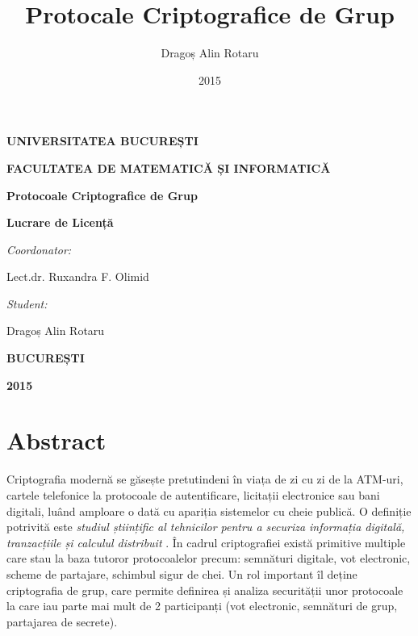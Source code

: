 \documentclass[oneside, 12pt]{book}
\title{Protocale Criptografice de Grup}
\author{Dragoș Alin Rotaru}
\date{2015}
\begin{document}
\thispagestyle{empty}

\nocite*{}

\begin{center}
\centerline{\bf UNIVERSITATEA BUCUREȘTI}
\centerline{\bf FACULTATEA DE MATEMATICĂ ȘI INFORMATICĂ}

\end{center}
\vspace{4.5cm}

\centerline{\huge \bf Protocoale Criptografice de Grup}

\vspace{0.5cm}

\centerline{\large \bf Lucrare de Licență}

\vspace{3.5cm}

\begin{flushleft}
{\Large \textit{Coordonator:}\vspace{0.2cm}}

{\Large Lect.dr. Ruxandra F. Olimid}
\end{flushleft}

\vspace{1cm}
\begin{flushright}
{\Large \textit{Student:}\vspace{0.2cm}}

{\Large Dragoș Alin Rotaru}
\end{flushright}


\vspace{2cm}

\centerline{\bf BUCUREȘTI}

\centerline{\bf 2015}

\chapter*{Abstract}

\hspace*{5mm} Criptografia modernă se găsește pretutindeni în viața de zi cu zi de la ATM-uri, cartele telefonice la protocoale de autentificare, licitații electronice sau bani digitali, luând amploare o dată cu apariția sistemelor cu cheie publică. O definiție potrivită este \textit{studiul științific al tehnicilor pentru a securiza informația digitală, tranzacțiile și calculul distribuit} \cite{Katz:2007}. În cadrul criptografiei există primitive multiple care stau la baza tutoror protocoalelor precum: semnături digitale, vot electronic, scheme de partajare, schimbul sigur de chei. Un rol important îl deține criptografia de grup, care permite definirea și analiza securității unor protocoale la care iau parte mai mult de 2 participanți (vot electronic, semnături de grup, partajarea de secrete).
\end{document}
